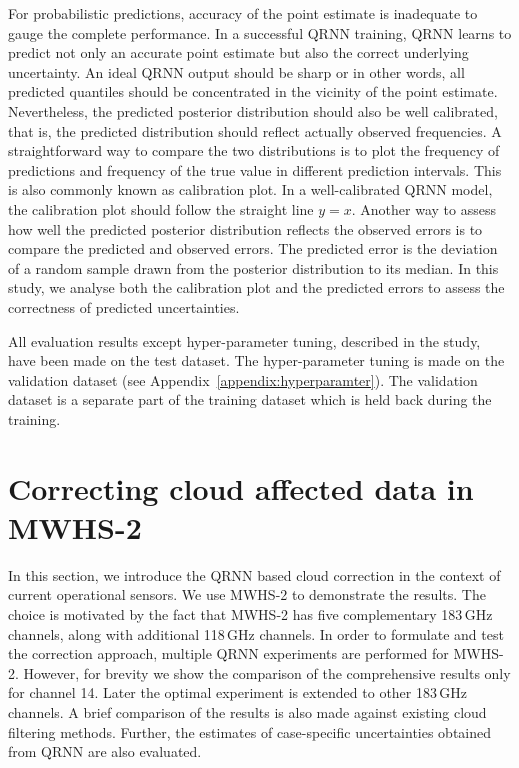 \documentclass[amt, manuscript]{copernicus}
\begin{document}
For probabilistic predictions, accuracy of the point estimate is inadequate to
gauge the complete performance. In a successful QRNN training, QRNN learns to
predict not only an accurate point estimate but also the correct underlying
uncertainty. An ideal QRNN output should be sharp or in other words, all
predicted quantiles should be concentrated in the vicinity of the point
estimate. Nevertheless, the predicted posterior distribution should also be
well calibrated, that is, the predicted distribution should reflect actually
observed frequencies. A straightforward way to compare the two distributions is
to plot the frequency of predictions and frequency of the true value in
different prediction intervals. This is also commonly known as calibration plot.
In a well-calibrated QRNN model, the calibration plot should follow the straight
line $y = x$. Another way to assess how well the predicted posterior distribution
reflects the observed errors is to compare the predicted and observed errors.
The predicted error is the deviation of a random sample drawn from the posterior
distribution to its median. In this study, we analyse both the calibration plot
and the predicted errors to assess the correctness of predicted uncertainties.  

All evaluation results except hyper-parameter tuning, described in the study, have been made on the test dataset. The hyper-parameter tuning is made on the validation dataset (see Appendix~\ref{appendix:hyperparamter}). The validation dataset is a separate part of the training dataset which is held back during the training.


\section{Correcting cloud affected data in MWHS-2}
\label{qrnn_mwhs}
%
In this section, we introduce the QRNN based cloud correction in the context of current operational sensors.  We use MWHS-2 to demonstrate the results. The choice is motivated by the fact that MWHS-2 has five complementary 183\,GHz channels, along with additional 118\,GHz channels. In order to formulate and test the correction approach, multiple QRNN experiments are performed for MWHS-2. However, for brevity we show the comparison of the comprehensive results only for channel 14. Later the optimal experiment is extended to other 183\,GHz channels. A brief comparison of the results is also made against existing cloud filtering methods. Further, the estimates of case-specific uncertainties obtained from QRNN are also evaluated.
\end{document}
